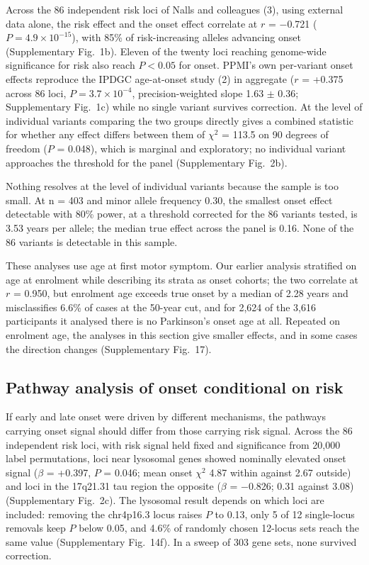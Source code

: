 \documentclass[10pt]{article}
\begin{document}
Across the 86 independent risk loci of Nalls and colleagues (3), using external data alone, the risk effect and the onset effect
correlate at $r$ = $-$0.721 ($P = 4.9\times10^{-15}$), with 85\% of risk-increasing alleles
advancing onset (Supplementary Fig.~1b). Eleven of the twenty loci reaching genome-wide significance for risk
also reach $P < 0.05$ for onset. PPMI's own per-variant onset effects reproduce the IPDGC age-at-onset study (2) in aggregate ($r$ = +0.375 across 86 loci, $P = 3.7\times10^{-4}$,
precision-weighted slope 1.63 $\pm$ 0.36; Supplementary Fig.~1c) while no single variant survives
correction. At
the level of individual variants comparing the two groups directly gives a combined statistic for whether any effect differs between them of $\chi^2$ = 113.5 on 90 degrees of freedom ($P$ = 0.048), which is marginal and exploratory; no
individual variant approaches the threshold for the panel (Supplementary Fig.~2b).

Nothing resolves at the level of individual variants because the sample is too small. At n = 403 and minor allele frequency 0.30, the smallest onset effect detectable with 80\% power, at a threshold corrected for the 86 variants tested, is 3.53 years per allele; the median true effect across the panel is 0.16. None of the 86 variants is detectable in
this sample.

These analyses use age at first motor symptom. Our earlier analysis stratified on age at enrolment
while describing its strata as onset cohorts; the two correlate at $r$ = 0.950, but enrolment age
exceeds true onset by a median of 2.28 years and misclassifies 6.6\% of cases at the 50-year cut,
and for 2,624 of the 3,616 participants it analysed there is no Parkinson's onset age at all. Repeated on enrolment age, the analyses in this section give smaller effects, and in some cases the direction changes (Supplementary Fig.~17).

\subsection*{Pathway analysis of onset conditional on risk}

If early and late onset were driven by different mechanisms, the pathways carrying onset signal
should differ from those carrying risk signal. Across the 86 independent risk loci, with risk
signal held fixed and significance from 20,000 label permutations, loci near lysosomal genes
showed nominally elevated onset signal ($\beta$ = +0.397, $P$ = 0.046; mean onset $\chi^2$ 4.87
within against 2.67 outside) and loci in the 17q21.31 tau region the opposite ($\beta$ =
$-$0.826; 0.31 against 3.08) (Supplementary Fig.~2c). The lysosomal result depends on which loci are included: removing the chr4p16.3 locus raises $P$ to 0.13, only 5 of 12 single-locus removals keep $P$ below 0.05,
and 4.6\% of randomly chosen 12-locus sets reach the same value (Supplementary Fig.~14f). In a sweep
of 303 gene sets, none survived correction.
\end{document}
